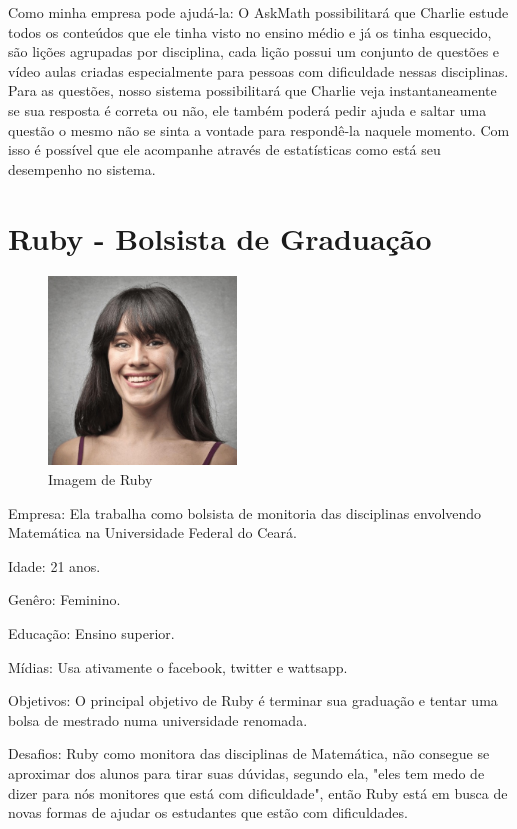 Como minha empresa pode ajudá-la: O AskMath possibilitará que Charlie estude 
todos os conteúdos que ele tinha visto no ensino médio e já os tinha esquecido, 
são lições agrupadas por disciplina, cada lição possui um conjunto de questões 
e vídeo aulas criadas especialmente para pessoas com dificuldade nessas 
disciplinas. Para as questões, nosso sistema possibilitará que Charlie veja 
instantaneamente se sua resposta é correta ou não, ele também poderá pedir ajuda 
e saltar uma questão o mesmo não se sinta a vontade para respondê-la naquele 
momento. Com isso é possível que ele acompanhe através de estatísticas como 
está seu desempenho no sistema.

\section{Ruby - Bolsista de Graduação}

\begin{figure}[H]
\centering
\includegraphics[width=5cm]{figuras/personas/figura_persona_2}
\caption{Imagem de Ruby}
\label{figura_persona_2}
\end{figure}


Empresa: Ela trabalha como bolsista de monitoria das disciplinas envolvendo 
Matemática na Universidade Federal do Ceará.

Idade: 21 anos.

Genêro: Feminino.

Educação: Ensino superior.

Mídias: Usa ativamente o facebook, twitter e wattsapp.

Objetivos: O principal objetivo de Ruby é terminar sua graduação e tentar uma 
bolsa de mestrado numa universidade renomada.

Desafios: Ruby como monitora das disciplinas de Matemática, não consegue se
aproximar dos alunos para tirar suas dúvidas, segundo ela, "eles tem medo de 
dizer para nós monitores que está com dificuldade", então Ruby está em busca de 
novas formas de ajudar os estudantes que estão com dificuldades.

